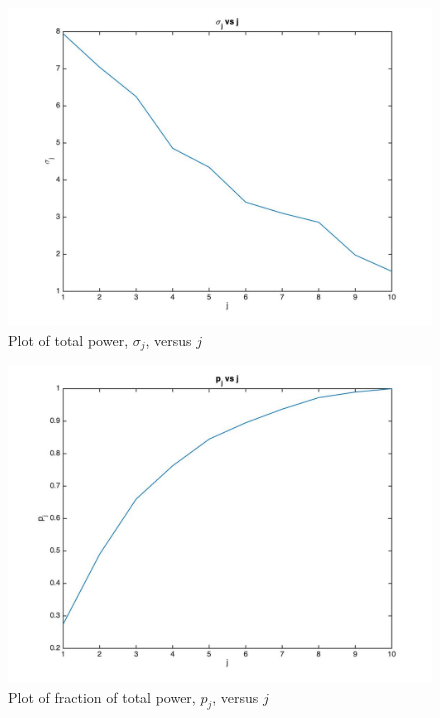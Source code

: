 \documentclass[12pt]{exam}
\begin{document}
\begin{questions}
  \begin{figure}[hpb!]
    \centering
    \includegraphics[scale=0.3]{data/sigma_vs_j.jpg}
    \caption{Plot of total power, $\sigma_j$, versus $j$}
    \label{fig:sigma_j_vs_j}
  \end{figure}

  \begin{figure}[hpb!]
    \centering
    \includegraphics[scale=0.3]{data/power_vs_j.jpg}{}
    \caption{Plot of fraction of total power, $p_j$, versus $j$}
    \label{fig:p_j_vs_j}
  \end{figure}


\end{questions}
\end{document}
